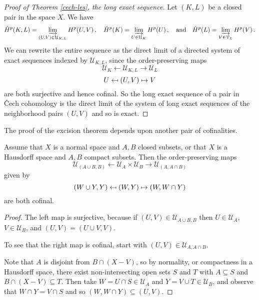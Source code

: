 \begin{proof}[Proof of Theorem \ref{cech-les}, the long exact sequence]
Let $(K,L)$ be a closed pair in the space $X$. We have
\[
\check{H}^p(K,L)=\varinjlim_{(U,V)\in\mathcal{U}_{K,L}}H^p(U,V)\,,
\quad
\check{H}^p(K)=\varinjlim_{U\in\mathcal{U}_K}H^p(U)\,,
\quad\hbox{and}\quad 
\check{H}^p(L)=\varinjlim_{V\in\mathcal{V}_L}H^p(V)\,.
\]
We can rewrite the entire sequence as
the direct limit of a directed system of exact sequences indexed by 
$\mathcal{U}_{K,L}$, since the order-preserving maps 
\[
\mathcal{U}_K \leftarrow \mathcal{U}_{K,L} \rightarrow \mathcal{U}_L 
\]
\[
U \mathrel{\reflectbox{$\mapsto$}} (U,V) \mapsto V
\]
are both surjective and hence cofinal. So the long exact sequence of a pair
in \v{C}ech cohomology is the direct limit of the system of long exact 
sequences of the neighborhood pairs $(U,V)$ and so is exact. 
\end{proof}

The proof of the excision theorem depends upon another pair of 
cofinalities.

\begin{lemma} Assume that $X$ is a normal space and $A,B$ closed subsets,
or that $X$ is a Hausdorff space and $A, B$ compact subsets.  
Then the order-preserving maps
\[
\mathcal{U}_{(A\cup B,B)} \leftarrow \mathcal{U}_A\times\mathcal{U}_B 
\rightarrow \mathcal{U}_{(A,A\cap B)}
\]
given by
\[
(W\cup Y,Y)\mathrel{\reflectbox{$\mapsto$}}(W,Y)\mapsto(W,W\cap Y)
\]
are both cofinal.
\label{lem-cofinal} 
\end{lemma}
\begin{proof}
The left map is surjective, because if $(U,V)\in\mathcal{U}_{A\cup B,B}$
then $U\in\mathcal{U}_A$, $V\in\mathcal{U}_B$, and $(U,V)=(U\cup V,V)$. 

To see that the right map is cofinal, start with 
$(U,V)\in\mathcal{U}_{A,A\cap B}$.


\noindent
Note that $A$ is disjoint from $B\cap(X-V)$, so by normality,
or compactness in a Hausdorff space, there exist
non-intersecting open sets $S$ and $T$ with $A\subseteq S$ and 
$B\cap(X-V)\subseteq T$. Then take $W=U\cap S\in\mathcal{U}_A$ and 
$Y=V\cup T\in\mathcal{U}_B$, and observe that $W\cap Y=V\cap S$ and so 
$(W,W\cap Y)\subseteq(U,V)$.
\end{proof}

